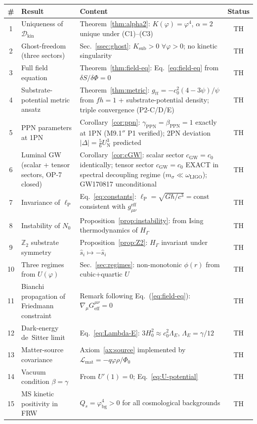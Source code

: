 \documentclass[11pt,a4paper]{article}
\renewcommand{\Phi}{\varPhi}
\newcommand{\PhiZero}{\varPhi_{0}}
\newcommand{\Nzero}{N_{0}}
\newcommand{\lP}{\ell_{\mathrm{P}}}
\newcommand{\Zp}{\mathbb{Z}_{2}}
\newcommand{\DD}{\mathcal{D}}
\begin{document}
\begin{center}\small
\begin{longtable}{@{}clp{7.2cm}c@{}}
\toprule
\# & \textbf{Result} & \textbf{Content} & \textbf{Status}\\
\midrule
\endhead
1 & Uniqueness of $\DD_{\mathrm{kin}}$
  & Theorem~\ref{thm:alpha2}: $K(\varphi)=\varphi^{4}$, $\alpha=2$ unique under (C1)--(C3)
  & \textsf{TH}\\
2 & Ghost-freedom (three sectors)
  & Sec.~\ref{ssec:ghost}: $K_{\mathrm{sub}}>0$ $\forall\varphi>0$; no kinetic singularity
  & \textsf{TH}\\
3 & Full field equation
  & Theorem~\ref{thm:field-eq}: Eq.~\eqref{eq:field-eq} from $\delta S/\delta\Phi=0$
  & \textsf{TH}\\
4 & Substrate-potential metric ansatz
  & Theorem~\ref{thm:metric}: $g_{tt}=-c_{0}^{2}(4-3\psi)/\psi$ from $fh=1$ + substrate-potential density;
    triple convergence (P2-C/D/E)
  & \textsf{TH}\\
5 & PPN parameters at 1PN
  & Corollary~\ref{cor:ppn}: $\gamma_{\mathrm{PPN}}=\beta_{\mathrm{PPN}}=1$ exactly at 1PN
    (M9.1$''$ P1 verified); 2PN deviation $|\Delta|=\tfrac{5}{6}U_{\mathrm{N}}^{3}$ predicted
  & \textsf{TH}\\
6 & Luminal GW (scalar + tensor sectors, OP-7 closed)
  & Corollary~\ref{cor:cGW}: scalar sector $c_{\mathrm{GW}}=c_{0}$ identically;
    tensor sector $c_{\mathrm{GW}}=c_{0}$ EXACT in spectral decoupling
    regime ($m_\sigma \ll \omega_{\mathrm{LIGO}}$); GW170817 unconditional
  & \textsf{TH}\\
7 & Invariance of $\lP$
  & Eq.~\eqref{eq:constants}: $\lP=\sqrt{G\hbar/c^{3}}=\mathrm{const}$ consistent with $g_{\mu\nu}^{\mathrm{eff}}$
  & \textsf{TH}\\
8 & Instability of $\Nzero$
  & Proposition~\ref{prop:instability}: from Ising thermodynamics of $H_{\Gamma}$
  & \textsf{TH}\\
9 & $\Zp$ substrate symmetry
  & Proposition~\ref{prop:Z2}: $H_{\Gamma}$ invariant under $\hat{s}_{i}\mapsto-\hat{s}_{i}$
  & \textsf{TH}\\
10 & Three regimes from $U(\varphi)$
  & Sec.~\ref{sec:regimes}: non-monotonic $\phi(r)$ from cubic+quartic $U$
  & \textsf{TH}\\
11 & Bianchi propagation of Friedmann constraint
  & Remark following Eq.~(\ref{eq:field-eq}): $\nabla_{\mu}G_{\mathrm{eff}}^{\mu\nu}=0$
  & \textsf{TH}\\
12 & Dark-energy de~Sitter limit
  & Eq.~\eqref{eq:Lambda-E}: $3H_{0}^{2}\approx c_{0}^{2}\Lambda_{E}$, $\Lambda_{E}=\gamma/12$
  & \textsf{TH}\\
13 & Matter-source covariance
  & Axiom~\ref{ax:source} implemented by $\mathcal{L}_{\mathrm{mat}}=-q\varphi\rho/\PhiZero$
  & \textsf{TH}\\
14 & Vacuum condition $\beta=\gamma$
  & From $U'(1)=0$; Eq.~\eqref{eq:U-potential}
  & \textsf{TH}\\
15 & MS kinetic positivity in FRW
  & $Q_{s}=\varphi_{\mathrm{bg}}^{4}>0$ for all cosmological backgrounds
  & \textsf{TH}\\
\bottomrule
\end{longtable}
\end{center}
\end{document}
